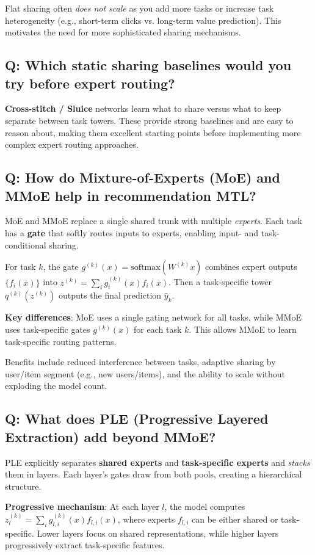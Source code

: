 Flat sharing often \emph{does not scale} as you add more tasks or increase task heterogeneity (e.g., short-term clicks vs. long-term value prediction). This motivates the need for more sophisticated sharing mechanisms.

\subsection*{Q: Which static sharing baselines would you try before expert routing?}
\textbf{Cross-stitch / Sluice} networks learn what to share versus what to keep separate between task towers. These provide strong baselines and are easy to reason about, making them excellent starting points before implementing more complex expert routing approaches.

\subsection*{Q: How do Mixture-of-Experts (MoE) and MMoE help in recommendation MTL?}
MoE and MMoE replace a single shared trunk with multiple \emph{experts}. Each task has a \textbf{gate} that softly routes inputs to experts, enabling input- and task-conditional sharing.

For task $k$, the gate $g^{(k)}(x)=\mathrm{softmax}(W^{(k)}x)$ combines expert outputs $\{f_i(x)\}$ into $z^{(k)}=\sum_i g^{(k)}_i(x) f_i(x)$. Then a task-specific tower $q^{(k)}(z^{(k)})$ outputs the final prediction $\hat y_k$.

\textbf{Key differences}: MoE uses a single gating network for all tasks, while MMoE uses task-specific gates $g^{(k)}(x)$ for each task $k$. This allows MMoE to learn task-specific routing patterns.

Benefits include reduced interference between tasks, adaptive sharing by user/item segment (e.g., new users/items), and the ability to scale without exploding the model count.

\subsection*{Q: What does PLE (Progressive Layered Extraction) add beyond MMoE?}
PLE explicitly separates \textbf{shared experts} and \textbf{task-specific experts} and \emph{stacks} them in layers. Each layer's gates draw from both pools, creating a hierarchical structure.

\textbf{Progressive mechanism}: At each layer $l$, the model computes $z^{(k)}_l = \sum_i g^{(k)}_{l,i}(x) f_{l,i}(x)$, where experts $f_{l,i}$ can be either shared or task-specific. Lower layers focus on shared representations, while higher layers progressively extract task-specific features.

